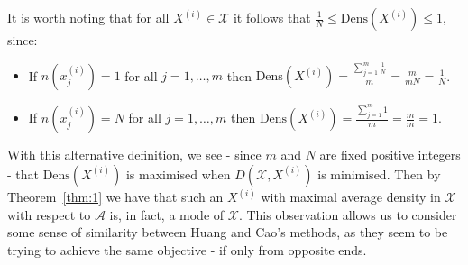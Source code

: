 \begin{remark}
    It is worth noting that for all \(X^{(i)} \in \mathcal{X}\) it follows that
    \(\frac{1}{N} \leq \text{Dens}\left(X^{(i)}\right)
    \leq 1\), since:		
	\begin{itemize}	
        \item If \(n\left(x_j^{(i)}\right) = 1\) for all \(j = 1, \ldots, m\)
            then \(%
                \text{Dens}\left(X^{(i)}\right)
                = \frac{\sum_{j=1}^m \frac{1}{N}}{m}
                = \frac{m}{mN}
                = \frac{1}{N}
            \).
        \item If \(n\left(x_j^{(i)}\right) = N\) for all \(j = 1, \ldots, m\)
            then \(%
                \text{Dens}\left(X^{(i)}\right)
                = \frac{\sum_{j=1}^m 1}{m}
                = \frac{m}{m}
                = 1
            \).
	\end{itemize}
\end{remark}



\begin{remark}
    With this alternative definition, we see \-- since \(m\) and \(N\) are fixed
    positive integers \-- that \(\text{Dens}(X^{(i)})\) is maximised when
    \(D(\mathcal{X}, X^{(i)})\) is minimised. Then by Theorem~\ref{thm:1} we have
    that such an \(X^{(i)}\) with maximal average density in \(\mathcal{X}\)
    with respect to \(\mathcal{A}\) is, in fact, a mode of \(\mathcal{X}\). This
    observation allows us to consider some sense of similarity between Huang and
    Cao's methods, as they seem to be trying to achieve the same objective \--
    if only from opposite ends.
\end{remark}

%
